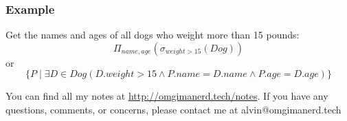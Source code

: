 \documentclass{math}
\begin{document}
\subsubsection*{Example}
Get the names and ages of all dogs who weight more than 15 pounds:
\[ \Pi_{name,age}(\sigma_{weight>15}(Dog)) \]
or
\[ \{P\mid\exists D\in Dog(D.weight>15\wedge P.name=D.name\wedge
  P.age=D.age)\} \]

\begin{center}
  You can find all my notes at \url{http://omgimanerd.tech/notes}. If you have
  any questions, comments, or concerns, please contact me at
  alvin@omgimanerd.tech
\end{center}
\end{document}
